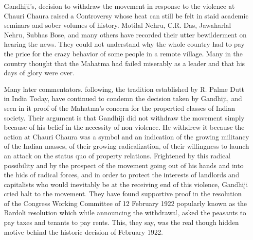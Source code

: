 Gandhiji's, decision to withdraw the movement in response to the violence at Chauri Chaura raised a Controversy whose heat can still be felt in staid academic seminars and sober volumes of history. Motilal Nehru, C.R. Das, Jawaharlal Nehru, Subhas Bose, and many others have recorded their utter bewilderment on hearing the news. They could not understand why the whole country had to pay the price for the crazy behavior of some people in a remote village. Many in the country thought that the Mahatma had failed miserably as a leader and that his days of glory were over. 

Many later commentators, following, the tradition established by R. Palme Dutt in India Today, have continued to condemn the decision taken by Gandhiji, and seen in it proof of the Mahatma's concern for the propertied classes of Indian society. Their argument is that Gandhiji did not withdraw the movement simply because of his belief in the necessity of non­ violence. He withdrew it because the action at Chauri Chaura was a symbol and an indication of the growing militancy of the Indian masses, of their growing radicalization, of their willingness to launch an attack on the status quo of property relations. Frightened by this radical possibility and by the prospect of the movement going out of his hands and into the hids of radical forces, and in order to protect the interests of landlords and capitalists who would inevitably be at the receiving end of this violence, Gandhiji cried halt to the movement. They have found supportive proof in the resolution of the Congress Working Committee of 12 February 1922 popularly known as the Bardoli resolution which while announcing the withdrawal, asked the peasants to pay taxes and tenants to pay rents. This, they say, was the real though hidden motive behind the historic decision of February 1922. 

